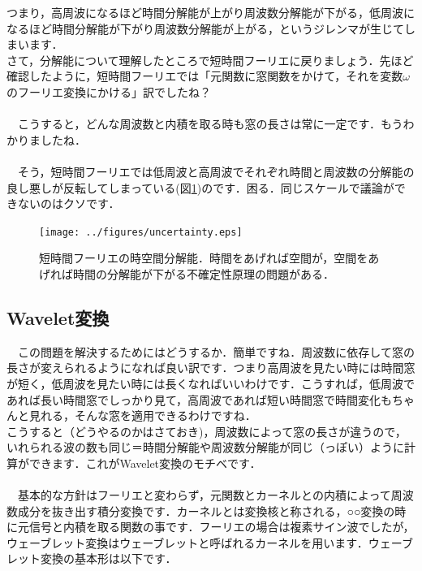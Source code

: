 \documentclass[11pt,a4paper]{ujreport} 	%
\begin{document}
つまり，高周波になるほど時間分解能が上がり周波数分解能が下がる，低周波になるほど時間分解能が下がり周波数分解能が上がる，というジレンマが生じてしまいます．\\

さて，分解能について理解したところで短時間フーリエに戻りましょう．先ほど確認したように，短時間フーリエでは「元関数に窓関数をかけて，それを変数$\omega$のフーリエ変換にかける」訳でしたね？\\
\\
　こうすると，どんな周波数と内積を取る時も窓の長さは常に一定です．もうわかりましたね．\\
\\
　そう，短時間フーリエでは低周波と高周波でそれぞれ時間と周波数の分解能の良し悪しが反転してしまっている(図\ref{im:furiers})のです．困る．同じスケールで議論ができないのはクソです．

\begin{figure}[H]
\label{im:furiers}
 \centering
 \texttt{[image: ../figures/uncertainty.eps]}
 \caption{短時間フーリエの時空間分解能．時間をあげれば空間が，空間をあげれば時間の分解能が下がる不確定性原理の問題がある．}
\end{figure}


\subsection{Wavelet変換}
　この問題を解決するためにはどうするか．簡単ですね．周波数に依存して窓の長さが変えられるようになれば良い訳です．つまり高周波を見たい時には時間窓が短く，低周波を見たい時には長くなればいいわけです．こうすれば，低周波であれば長い時間窓でしっかり見て，高周波であれば短い時間窓で時間変化もちゃんと見れる，そんな窓を適用できるわけですね．\\


こうすると（どうやるのかはさておき)，周波数によって窓の長さが違うので，いれられる波の数も同じ＝時間分解能や周波数分解能が同じ（っぽい）ように計算ができます．これがWavelet変換のモチベです．\\
\\
　基本的な方針はフーリエと変わらず，元関数とカーネルとの内積によって周波数成分を抜き出す積分変換です．カーネルとは変換核と称される，○○変換の時に元信号と内積を取る関数の事です．フーリエの場合は複素サイン波でしたが，ウェーブレット変換はウェーブレットと呼ばれるカーネルを用います．ウェーブレット変換の基本形は以下です．\\
\end{document}
